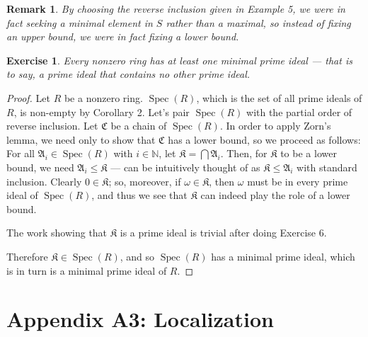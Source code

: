 \documentclass[12pt,reqno]{amsart}
\theoremstyle{plain}
\newtheorem{exercise}{Exercise}
\newtheorem{rem}{Remark}
\DeclareMathOperator{\spec}{Spec}
\newcommand{\nn}{\mathbb N}
\newcommand{\idealA}{\mathfrak{A}}
\newcommand{\C}{\mathfrak{C}}
\begin{document}
\begin{rem} By choosing the reverse inclusion given in Example 5, we were in fact seeking a minimal element in $S$ rather than a maximal, so instead of fixing an upper bound, we were in fact fixing a lower bound. 
\end{rem}
\begin{exercise} Every nonzero ring has at least one minimal prime ideal — that is to say, a prime ideal that contains no other prime ideal. 
\end{exercise} 
\begin{proof}
Let $R$ be a nonzero ring. $\spec (R)$, which is the set of all prime ideals of $R$, is non-empty by Corollary 2. Let's pair $\spec (R)$ with the partial order of reverse inclusion. 
Let $\C$ be a chain of $\spec(R)$. In order to apply Zorn's lemma, we need only to show that $\C$ has a lower bound, so we proceed as follows: For all $\idealA_i \in \spec (R)$ with $i \in \nn$, let $\mathfrak{K} = \bigcap \idealA_i$. Then, for $\mathfrak{K}$ to be a lower bound, we need $ \idealA_i \leq \mathfrak{K}$ — can be intuitively thought of as $\mathfrak{K} \leq \idealA_i$ with standard inclusion. Clearly $0 \in \mathfrak{K}$; so, moreover, if $\omega \in \mathfrak{K}$, then $\omega$ must be in every prime ideal of $\spec (R)$, and thus we see that $\mathfrak{K}$ can indeed play the role of a lower bound. 

The work showing that $\mathfrak{K}$ is a prime ideal is trivial after doing Exercise 6. 

Therefore $\mathfrak{K} \in \spec(R)$, and so $\spec(R)$ has a minimal prime ideal, which is in turn is a minimal prime ideal of $R$.  
\end{proof}
\section*{Appendix A3: Localization}
\end{document}
